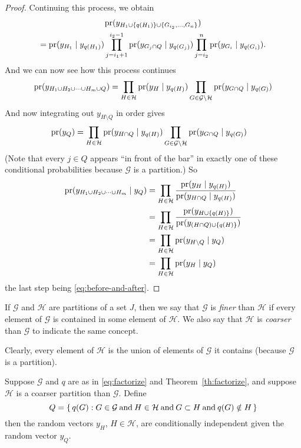 \begin{proof}
Continuing this process, we obtain
\begin{multline*}
   \operatorname{pr}(y_{H_1 \cup \{q(H_1)\} \cup \{ G_{i_2}, \ldots, G_n \}})
   \\
   =
   \operatorname{pr}(y_{H_1} \mid y_{q(H_1)})
   \prod_{j = i_1 + 1}^{i_2 - 1}
   \operatorname{pr}(y_{G_j \cap Q} \mid y_{q(G_j)})
   \prod_{j = i_2}^n
   \operatorname{pr}(y_{G_i} \mid y_{q(G_i)}).
\end{multline*}
And we can now see how this process continues
$$
   \operatorname{pr}(y_{H_1 \cup H_2 \cup \cdots \cup H_m \cup Q})
   =
   \prod_{H \in \mathcal{H}}
   \operatorname{pr}(y_H \mid y_{q(H)})
   \prod_{G \in \mathcal{G} \setminus \mathcal{H}}
   \operatorname{pr}(y_{G \cap Q} \mid y_{q(G)})
$$
And now integrating out $y_{H \setminus Q}$ in order gives
\begin{align*}
   \operatorname{pr}(y_Q)
   & =
   \prod_{H \in \mathcal{H}}
   \operatorname{pr}(y_{H \cap Q} \mid y_{q(H)})
   \prod_{G \in \mathcal{G} \setminus \mathcal{H}}
   \operatorname{pr}(y_{G \cap Q} \mid y_{q(G)})
\end{align*}
(Note that every $j \in Q$ appears ``in front of the bar'' in
exactly one of these conditional probabilities because $\mathcal{G}$
is a partition.)
So
\begin{align*}
   \operatorname{pr}(y_{H_1 \cup H_2 \cup \cdots \cup H_m} \mid y_Q)
   & =
   \prod_{H \in \mathcal{H}}
   \frac{ \operatorname{pr}(y_H \mid y_{q(H)}) }{ \operatorname{pr}(y_{H \cap Q} \mid y_{q(H)}) }
   \\
   & =
   \prod_{H \in \mathcal{H}}
   \frac{ \operatorname{pr}(y_{H \cup \{q(H)\}}) }{ \operatorname{pr}(y_{(H \cap Q) \cup \{q(H)\}}) }
   \\
   & =
   \prod_{H \in \mathcal{H}}
   \operatorname{pr}( y_{H \setminus Q} \mid y_{Q} )
   \\
   & =
   \prod_{H \in \mathcal{H}}
   \operatorname{pr}( y_H \mid y_{Q} )
\end{align*}
the last step being \eqref{eq:before-and-after}.
\end{proof}

If $\mathcal{G}$ and $\mathcal{H}$ are partitions of a set $J$,
then we say that $\mathcal{G}$ is \emph{finer} than $\mathcal{H}$
if every element of $\mathcal{G}$ is contained in some element
of $\mathcal{H}$.  We also say that $\mathcal{H}$ is \emph{coarser}
than $\mathcal{G}$ to indicate the same concept.

Clearly, every element of $\mathcal{H}$ is the union of elements
of $\mathcal{G}$ it contains (because $\mathcal{G}$ is a partition).

\begin{theorem} \label{th:markov}
Suppose $\mathcal{G}$ and $q$ are as in \eqref{eq:factorize}
and Theorem~\ref{th:factorize}, and suppose $\mathcal{H}$ is a coarser
partition than $\mathcal{G}$.  Define
\begin{equation} \label{eq:q-markov}
   Q = \{\,  q(G) : G \in \mathcal{G} \mathbin{\rm and} H \in \mathcal{H}
   \mathbin{\rm and} G \subset H \mathbin{\rm and} q(G) \notin H  \,\}
\end{equation}
then the random vectors $y_H$, $H \in \mathcal{H}$, are conditionally
independent given the random vector $y_Q$.
\end{theorem}

